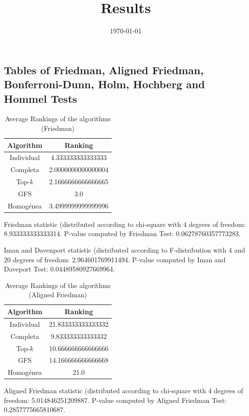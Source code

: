 \documentclass[a4paper,10pt]{article}
\title{Results}
\author{}
\date{\today}
\begin{document}
\begin{landscape}
\oddsidemargin 0in \topmargin 0in\maketitle
\section{Tables of Friedman, Aligned Friedman, Bonferroni-Dunn, Holm, Hochberg and Hommel Tests}
\begin{table}[!htp]
\centering
\caption{Average Rankings of the algorithms (Friedman)
}\begin{tabular}{c|c}
Algorithm&Ranking\\
\hline
Individual&4.333333333333333\\
Completa&2.0000000000000004\\
Top-$k$&2.1666666666666665\\
GFS&3.0\\
Homogénea&3.4999999999999996\\
\end{tabular}
\end{table}


Friedman statistic (distributed according to chi-square with 4 degrees of freedom: 8.933333333333314. 
P-value computed by Friedman Test: 0.06278760357773283.\newline

Iman and Davenport statistic (distributed according to F-distribution with 4 and 20 degrees of freedom: 2.964601769911494. 
P-value computed by Iman and Daveport Test: 0.04489580927669964.\newline


\newpage

\begin{table}[!htp]
\centering
\caption{Average Rankings of the algorithms (Aligned Friedman)
}\begin{tabular}{c|c}
Algorithm&Ranking\\
\hline
Individual&21.833333333333332\\
Completa&9.833333333333332\\
Top-$k$&10.666666666666666\\
GFS&14.166666666666668\\
Homogénea&21.0\\
\end{tabular}
\end{table}


Aligned Friedman statistic (distributed according to chi-square with 4 degrees of freedom: 5.014846251209887. 
P-value computed by Aligned Friedman Test: 0.2857775665810687.\newline



\end{landscape}
\end{document}
